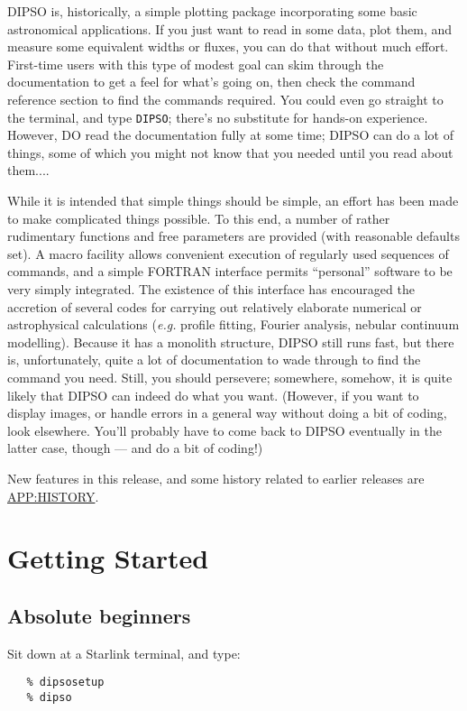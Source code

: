 DIPSO is, historically, a simple plotting package incorporating some
basic astronomical applications. If you just want to read in some
data, plot them, and measure some equivalent widths or fluxes, you can
do that without much effort. First-time users with this type of modest
goal can skim through the documentation to get a feel for what's going
on, then check the command reference section to find the commands
required. You could even go straight to the terminal, and type {\tt{DIPSO}}; 
there's no substitute for hands-on experience. However, DO read the
documentation fully at some time; DIPSO can do a lot of things, some
of which you might not know that you needed until you read about
them....

While it is intended that simple things should be simple, an effort
has been made to make complicated things possible. To this end, a
number of rather rudimentary functions and free parameters are
provided (with reasonable defaults set). A macro facility allows
convenient execution of regularly used sequences of commands, and a
simple FORTRAN interface permits ``personal'' software to be very
simply integrated. The existence of this interface has encouraged the
accretion of several codes for carrying out relatively elaborate
numerical or astrophysical calculations ({\em e.g.} profile fitting,
Fourier analysis, nebular continuum modelling). Because it has a
monolith structure, DIPSO still runs fast, but there is,
unfortunately, quite a lot of documentation to wade through to find
the command you need. Still, you should persevere; somewhere, somehow,
it is quite likely that DIPSO can indeed do what you want. (However,
if you want to display images, or handle errors in a general way
without doing a bit of coding, look elsewhere. You'll probably have to
come back to DIPSO eventually in the latter case, though --- and do a
bit of coding!)

New features in this release, and some history related to earlier releases
are \hyperref{described here}{contained in appendix }{}{APP:HISTORY}.


\section {Getting Started}

\subsection {Absolute beginners}
Sit down at a Starlink terminal, and type:
\begin{verbatim}
   % dipsosetup
   % dipso
\end{verbatim}

